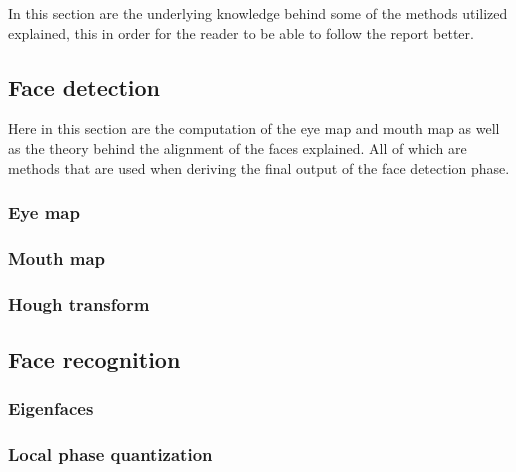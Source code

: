 In this section are the underlying knowledge behind some of the methods utilized explained, this in order for the reader to be able to follow the report better.

\subsection{Face detection}

Here in this section are the computation of the eye map and mouth map as well as the theory behind the alignment of the faces explained. All of which are methods that are used when deriving the final output of the face detection phase.

\subsubsection{Eye map}
\label{sub:FaceDetection}


\subsubsection{Mouth map}


\subsubsection{Hough transform}


\subsection{Face recognition}
\label{sub:FaceRecognition}


\subsubsection{Eigenfaces}
\label{subs:Eigenfaces}


\subsubsection{Local phase quantization}
\label{subs:LocalPhaseQuantization}

